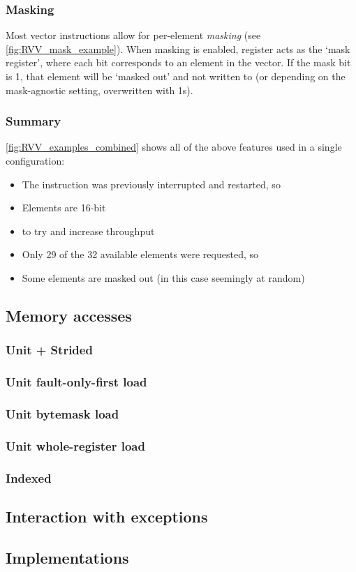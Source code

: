 \subsubsection{Masking}
Most vector instructions allow for per-element \emph{masking} (see \cref{fig:RVV_mask_example}).
When masking is enabled, register  acts as the `mask register', where each bit corresponds to an element in the vector.
If the mask bit is 1, that element will be `masked out' and not written to (or depending on the mask-agnostic setting, overwritten with 1s).



\subsubsection{Summary}

\cref{fig:RVV_examples_combined} shows all of the above features used in a single configuration:
\begin{itemize}
    \item The instruction was previously interrupted and restarted, so 
    \item Elements are 16-bit
    \item {} to try and increase throughput
    \item Only 29 of the 32 available elements were requested, so 
    \item Some elements are masked out (in this case seemingly at random)
\end{itemize}

\subsection{Memory accesses}

\subsubsection{Unit + Strided}

\subsubsection{Unit fault-only-first load}
\subsubsection{Unit bytemask load}
\subsubsection{Unit whole-register load}

\subsubsection{Indexed}

\subsection{Interaction with exceptions}

\subsection{Implementations}